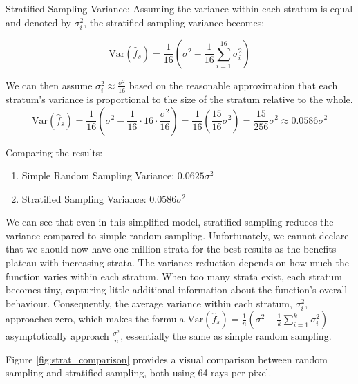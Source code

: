\documentclass[12pt]{article}
\begin{document}
Stratified Sampling Variance: Assuming the variance within each stratum is equal and denoted by $\sigma^2_i$, the stratified sampling variance becomes:

\[
    \text{Var}(\hat{f}_s) = \frac{1}{16} \left( \sigma^2 - \frac{1}{16} \sum_{i=1}^{16} \sigma_i^2 \right)
\]

We can then assume $\sigma_i^2 \approx \frac{\sigma^2}{16}$ based on the reasonable approximation that each stratum's variance is proportional to the size of the stratum relative to the whole.
\[
    \text{Var}(\hat{f}_s)
    = \frac{1}{16} \left( \sigma^2 - \frac{1}{16} \cdot 16 \cdot \frac{\sigma^2}{16} \right)
    = \frac{1}{16} \left( \frac{15}{16} \sigma^2 \right)
    = \frac{15}{256}\sigma^2 \approx 0.0586\sigma^2
\]

Comparing the results:
\begin{enumerate}
    \item[] Simple Random Sampling Variance: $0.0625\sigma^2$
    \item[] Stratified Sampling Variance: $0.0586\sigma^2$
\end{enumerate}

We can see that even in this simplified model, stratified sampling reduces the variance compared to simple random sampling. Unfortunately, we cannot declare that we should now have one million strata for the best results as the benefits plateau with increasing strata. The variance reduction depends on how much the function varies within each stratum. When too many strata exist, each stratum becomes tiny, capturing little additional information about the function's overall behaviour. Consequently, the average variance within each stratum, $\sigma_i^2$, approaches zero, which makes the formula $\text{Var}(\hat{f}_s) = \frac{1}{n} \left( \sigma^2 - \frac{1}{k} \sum_{i=1}^k \sigma_i^2 \right)$ asymptotically approach $\frac{\sigma^2}{n}$, essentially the same as simple random sampling.

Figure \ref{fig:strat_comparison} provides a visual comparison between random sampling and stratified sampling, both using 64 rays per pixel.
\end{document}
